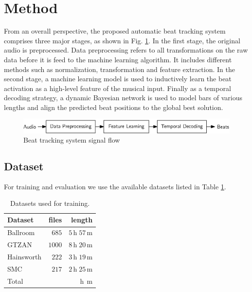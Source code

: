\documentclass{scrartcl}
\begin{document}
\section{Method}
\label{sec:method}

From an overall perspective, the proposed automatic beat tracking system comprises three major stages, as shown in Fig. \ref{fig:system}. In the first stage, the original audio is preprocessed. Data preprocessing refers to all transformations on the raw data before it is feed to the machine learning algorithm. It includes different methods such as normalization, transformation and feature extraction. In the second stage, a machine learning model is used to inductively learn the beat activation as a high-level feature of the musical input. Finally as a temporal decoding strategy, a dynamic Bayesian network is used to model bars of various lengths and align the predicted beat positions to the global best solution.  

\begin{figure}[htbp]
\centering
\includegraphics[scale=1.0]{figures/beat_tracking_system.eps}
\caption{Beat tracking system signal flow}
\label{fig:system}
\end{figure}  


\subsection{Dataset}
For training and evaluation we use the available datasets listed in Table \ref{tab:datasets}.
\begin{table}[htbp]
\caption{Datasets used for training.}
\label{tab:datasets}
\centering
\begin{tabular}{lrr}
\hline
\hline
\textbf{Dataset} & \textbf{files} & \textbf{length} \\
\hline
Ballroom \cite{Gouyon2006b, Krebs2013} & $685$ & $5\,\text{h} \;57\,\text{m}$\\
GTZAN \cite{Tzanetakis2002b, marchand2015swing} & $1000$ & $8\,\text{h}\;20\,\text{m}$\\
Hainsworth \cite{Hainsworth2004} & $222$ & $3\,\text{h}\;19\,\text{m}$\\
SMC \cite{Holzapfel2012} & $217$ & $2\,\text{h}\;25\,\text{m}$\\    
\hline
Total & $ $ & $ \,\text{h}\; \,\text{m}$\\  
\hline
\hline
\end{tabular}
\end{table}  
\end{document}
